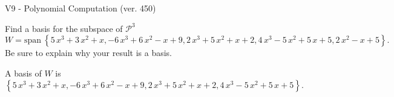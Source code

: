 \begin{exercise}
  \begin{exerciseTitle}V9 - Polynomial Computation (ver. 450)\end{exerciseTitle}
  \begin{exerciseStatement}
    Find a basis for the subspace of \(\mathcal{P}^3\) 
\[W=\mathrm{span}\ \left\{5 \, x^{3} + 3 \, x^{2} + x , -6 \, x^{3} + 6 \, x^{2} - x + 9 , 2 \, x^{3} + 5 \, x^{2} + x + 2 , 4 \, x^{3} - 5 \, x^{2} + 5 \, x + 5 , 2 \, x^{2} - x + 5\right\}.\]
 Be sure to explain why your result is a basis.


  \end{exerciseStatement}
  \begin{exerciseAnswer}
   A basis of \(W\) is  \(\left\{5 \, x^{3} + 3 \, x^{2} + x , -6 \, x^{3} + 6 \, x^{2} - x + 9 , 2 \, x^{3} + 5 \, x^{2} + x + 2 , 4 \, x^{3} - 5 \, x^{2} + 5 \, x + 5\right\}\).
  


  \end{exerciseAnswer}
\end{exercise}